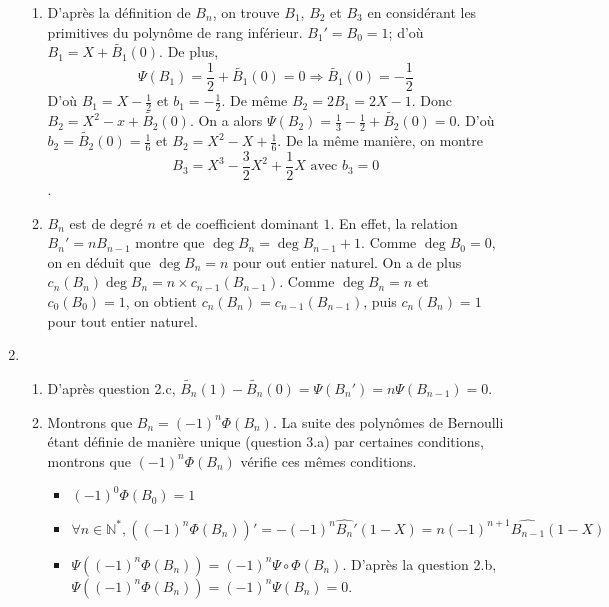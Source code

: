 \begin{enumerate}
\begin{enumerate}
\item D'après la définition de $B_n$, on trouve $B_1$, $B_2$ et $B_3$ en considérant les primitives du polynôme de rang inférieur.\newline
 $B_1'=B_0=1$; d'où $B_1 = X + \widetilde{B_1}(0)$. De plus, 
		\[\Psi (B_1)=\frac{1}{2}+\widetilde{B_1}(0)=0 \Rightarrow \widetilde{B_1}(0)=-\frac{1}{2}\]
D'où $B_1 = X-\frac{1}{2}$ et $b_1=-\frac{1}{2}$.\newline
De même $B_2=2B_1=2X-1$. Donc $B_2 = X^2-x+\widetilde{B_2}(0)$. On a alors $\Psi(B_2)=\frac{1}{3}-\frac{1}{2}+\widetilde{B_2}(0)=0$.\newline 
D'où $b_2=\widetilde{B_2}(0)=\frac{1}{6}$ et $B_2=X^2-X+\frac{1}{6}$.\newline 
De la même manière, on montre 
		\[B_3=X^3-\frac{3}{2}X^2+\frac{1}{2}X \text{ avec } b_3 = 0\].
		
\item $B_n$ est de degré $n$ et de coefficient dominant $1$.\newline 
En effet, la relation $B_n'=nB_{n-1}$ montre que $\deg B_n=\deg B_{n-1}+1$. Comme $\deg B_0=0$, on en déduit que $\deg B_n=n$ pour out entier naturel.\newline 
On a de plus $c_n(B_n)\deg B_n=n\times c_{n-1}(B_{n-1})$. Comme $\deg B_n=n$ et $c_0(B_0)=1$, on obtient $c_n(B_n)=c_{n-1}(B_{n-1})$, puis $c_n(B_n)=1$ pour tout entier naturel.
\end{enumerate}
	
\item
\begin{enumerate}
\item D'après question 2.c, $\widetilde{B_n}(1)-\widetilde{B_n}(0) = \Psi(B_n')=n\Psi(B_{n-1})=0$.
		
\item Montrons que $B_n=(-1)^n \Phi(B_n)$.\newline 
La suite des polynômes de Bernoulli étant définie de manière unique (question 3.a) par certaines conditions, montrons que $(-1)^n \Phi(B_n)$ vérifie ces mêmes conditions.
\begin{itemize}
\item $(-1)^0 \Phi(B_0)=1$		
\item \[\forall n \in \mathbb{N}^*, ((-1)^n \Phi(B_n))' = -(-1)^n \widehat{B_n}'(1-X)=n(-1)^{n+1}\widehat{B_{n-1}}(1-X)\]
\item $\Psi ((-1)^n\Phi(B_n))=(-1)^n\Psi \circ \Phi(B_n)$.\newline 
D'après la question 2.b, $\Psi ((-1)^n\Phi(B_n))=(-1)^n\Psi (B_n)=0$.
\end{itemize}
		

\end{enumerate}
\end{enumerate}
